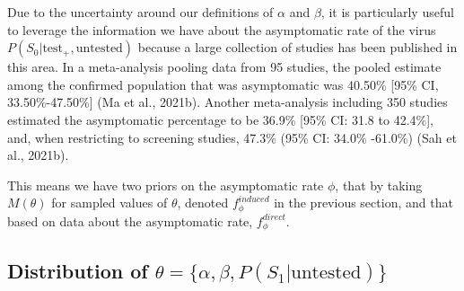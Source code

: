 \documentclass[12pt,twoside]{smiththesis}
\begin{document}
Due to the uncertainty around our definitions of \(\alpha\) and \(\beta\), it is particularly useful to leverage the information we have about the asymptomatic rate of the virus \(P(S_0|\text{test}_+,\text{untested})\) because a large collection of studies has been published in this area. In a meta-analysis pooling data from 95 studies, the pooled estimate among the confirmed population that was asymptomatic was 40.50\% {[}95\% CI, 33.50\%-47.50\%{]} (Ma et al., 2021b). Another meta-analysis including 350 studies estimated the asymptomatic percentage to be 36.9\% {[}95\% CI: 31.8 to 42.4\%{]}, and, when restricting to screening studies, 47.3\% (95\% CI: 34.0\% -61.0\%) (Sah et al., 2021b).

This means we have two priors on the asymptomatic rate \(\phi\), that by taking \(M(\theta)\) for sampled values of \(\theta\), denoted \(f_\phi^{induced}\) in the previous section, and that based on data about the asymptomatic rate, \(f_\phi^{direct}\).

\newpage

\hypertarget{distribution-of-theta-alpha-beta-ps_1textuntested}{%
\subsection{\texorpdfstring{Distribution of \(\theta = \{\alpha, \beta, P(S_1|\text{untested}) \}\)}{Distribution of \textbackslash theta = \textbackslash\{\textbackslash alpha, \textbackslash beta, P(S\_1\textbar\textbackslash text\{untested\}) \textbackslash\}}}\label{distribution-of-theta-alpha-beta-ps_1textuntested}}
\end{document}
